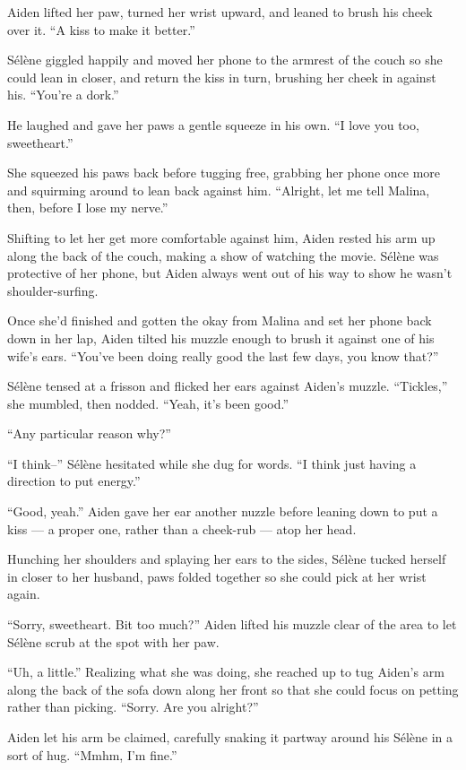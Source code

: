 Aiden lifted her paw, turned her wrist upward, and leaned to brush his cheek over it. ``A kiss to make it better.''

Sélène giggled happily and moved her phone to the armrest of the couch so she could lean in closer, and return the kiss in turn, brushing her cheek in against his. ``You're a dork.''

He laughed and gave her paws a gentle squeeze in his own. ``I love you too, sweetheart.''

She squeezed his paws back before tugging free, grabbing her phone once more and squirming around to lean back against him. ``Alright, let me tell Malina, then, before I lose my nerve.''

Shifting to let her get more comfortable against him, Aiden rested his arm up along the back of the couch, making a show of watching the movie. Sélène was protective of her phone, but Aiden always went out of his way to show he wasn't shoulder-surfing.

Once she'd finished and gotten the okay from Malina and set her phone back down in her lap, Aiden tilted his muzzle enough to brush it against one of his wife's ears. ``You've been doing really good the last few days, you know that?''

Sélène tensed at a frisson and flicked her ears against Aiden's muzzle. ``Tickles,'' she mumbled, then nodded. ``Yeah, it's been good.''

``Any particular reason why?''

``I think--'' Sélène hesitated while she dug for words. ``I think just having a direction to put energy.''

``Good, yeah.'' Aiden gave her ear another nuzzle before leaning down to put a kiss --- a proper one, rather than a cheek-rub --- atop her head.

Hunching her shoulders and splaying her ears to the sides, Sélène tucked herself in closer to her husband, paws folded together so she could pick at her wrist again.

``Sorry, sweetheart. Bit too much?'' Aiden lifted his muzzle clear of the area to let Sélène scrub at the spot with her paw.

``Uh, a little.'' Realizing what she was doing, she reached up to tug Aiden's arm along the back of the sofa down along her front so that she could focus on petting rather than picking. ``Sorry. Are you alright?''

Aiden let his arm be claimed, carefully snaking it partway around his Sélène in a sort of hug. ``Mmhm, I'm fine.''

